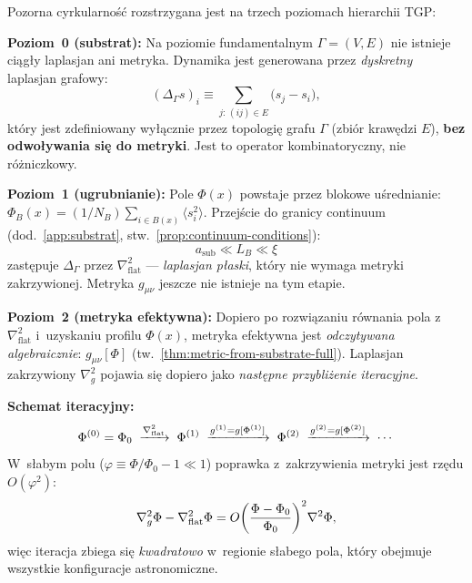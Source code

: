 \begin{theorem}%
\label{thm:circularity-resolved}
Pozorna cyrkularno\'s\'c rozstrzygana jest na trzech poziomach
hierarchii TGP:

\textbf{Poziom~0 (substrat):}\;
Na poziomie fundamentalnym $\Gamma = (V, E)$ nie istnieje ci\k{a}g\l{}y
laplasjan ani metryka. Dynamika jest generowana przez \emph{dyskretny}
laplasjan grafowy:
\begin{equation}\label{eq:graph-laplacian}
    (\Delta_\Gamma s)_i \equiv \sum_{j:\,(ij)\in E}
    \bigl(s_j - s_i\bigr),
\end{equation}
kt\'ory jest zdefiniowany wy\l{}\k{a}cznie przez topologi\k{e} grafu
$\Gamma$ (zbi\'or kraw\k{e}dzi $E$), \textbf{bez odwo\l{}ywania
si\k{e} do metryki}. Jest to operator kombinatoryczny, nie
r\'o\.zniczkowy.

\textbf{Poziom~1 (ugrubnianie):}\;
Pole $\Phi(x)$ powstaje przez blokowe u\'srednianie:
$\Phi_B(x) = (1/N_B)\sum_{i \in B(x)} \langle s_i^2\rangle$.
Przej\'scie do granicy continuum (dod.~\ref{app:substrat},
stw.~\ref{prop:continuum-conditions}):
\begin{equation}
    a_{\mathrm{sub}} \ll L_B \ll \xi
\end{equation}
zast\k{e}puje $\Delta_\Gamma$ przez $\nabla^2_{\mathrm{flat}}$
--- \emph{laplasjan p\l{}aski}, kt\'ory nie wymaga metryki
zakrzywionej. Metryka $g_{\mu\nu}$ jeszcze nie istnieje
na tym etapie.

\textbf{Poziom~2 (metryka efektywna):}\;
Dopiero po rozwi\k{a}zaniu r\'ownania pola z~$\nabla^2_{\mathrm{flat}}$
i~uzyskaniu profilu $\Phi(x)$,
metryka efektywna jest \emph{odczytywana algebraicznie}:
$g_{\mu\nu}[\Phi]$ (tw.~\ref{thm:metric-from-substrate-full}).
Laplasjan zakrzywiony $\nabla^2_g$ pojawia si\k{e} dopiero
jako \emph{nast\k{e}pne przybli\.zenie iteracyjne}.

\textbf{Schemat iteracyjny:}
\begin{equation}\label{eq:bootstrap-iteration}
    \Phi^{(0)} = \Phi_0 \;\xrightarrow{\nabla^2_{\rm flat}}\;
    \Phi^{(1)} \;\xrightarrow{g^{(1)} = g[\Phi^{(1)}]}\;
    \Phi^{(2)} \;\xrightarrow{g^{(2)} = g[\Phi^{(2)}]}\;
    \cdots
\end{equation}
W~s\l{}abym polu ($\varphi \equiv \Phi/\Phi_0 - 1 \ll 1$)
poprawka z~zakrzywienia metryki jest rz\k{e}du $O(\varphi^2)$:
\begin{equation}
    \nabla^2_g \Phi - \nabla^2_{\rm flat}\Phi
    = O\!\left(\frac{\Phi - \Phi_0}{\Phi_0}\right)^2\!\nabla^2 \Phi,
\end{equation}
wi\k{e}c iteracja zbiega si\k{e} \emph{kwadratowo}
w~regionie s\l{}abego pola,
kt\'ory obejmuje wszystkie konfiguracje astronomiczne.
\end{theorem}

